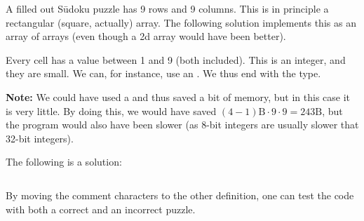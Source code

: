 A filled out Sūdoku puzzle has 9 rows and 9 columns. This is in principle a rectangular (square, actually) array. The following solution implements this as an array of arrays (even though a 2d array would have been better). %

Every cell has a value between 1 and 9 (both included). This is an integer, and they are small. We can, for instance, use an . We thus end with the type.

\textbf{Note:} We could have used a  and thus saved a bit of memory, but in this case it is very little. By doing this, we would have saved $(4-1)\mathrm{B} \cdot 9 \cdot 9=243\mathrm{B}$, but the program would also have been slower (as 8-bit integers are usually slower that 32-bit integers).

The following is a solution:
\inputminted{csharp}{\context/answer/SudokuVerifier.cs}

By moving the comment characters to the other  definition, one can test the code with both a correct and an incorrect puzzle.

